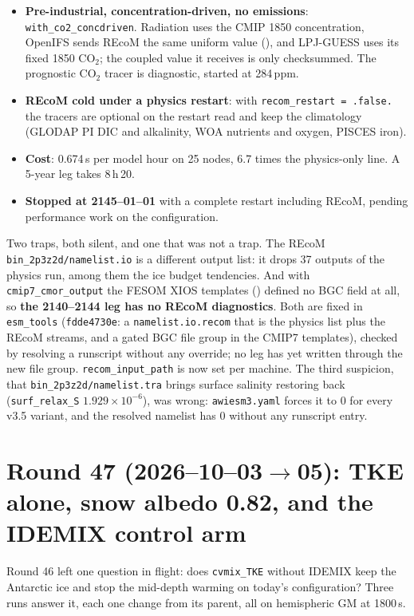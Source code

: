 \documentclass[10pt]{article}
\begin{document}
\begin{itemize}\itemsep1pt
\item \textbf{Pre-industrial, concentration-driven, no emissions}: \texttt{with\_co2\_concdriven}.
      Radiation uses the CMIP 1850 concentration, OpenIFS sends REcoM the same uniform value
      (), and LPJ-GUESS uses its fixed 1850 CO$_2$; the coupled value
      it receives is only checksummed. The prognostic CO$_2$ tracer is diagnostic, started at 284\,ppm.
\item \textbf{REcoM cold under a physics restart}: with \texttt{recom\_restart = .false.} the tracers
      are optional on the restart read and keep the climatology (GLODAP PI DIC and alkalinity, WOA
      nutrients and oxygen, PISCES iron).
\item \textbf{Cost}: 0.674\,s per model hour on 25 nodes, 6.7 times the physics-only line. A 5-year
      leg takes 8\,h\,20.
\item \textbf{Stopped at 2145--01--01} with a complete restart including REcoM, pending performance
      work on the configuration.
\end{itemize}

\noindent Two traps, both silent, and one that was not a trap. The REcoM
\texttt{bin\_2p3z2d/namelist.io} is a different output list: it drops 37 outputs of the physics run,
among them the ice budget tendencies. And with \texttt{cmip7\_cmor\_output} the FESOM XIOS templates
() defined no BGC field at all, so \textbf{the 2140--2144 leg has no REcoM
diagnostics}. Both are fixed in \texttt{esm\_tools} (\texttt{fdde4730e}: a \texttt{namelist.io.recom}
that is the physics list plus the REcoM streams, and a gated BGC file group in the CMIP7 templates),
checked by resolving a runscript without any override; no leg has yet written through the new file
group. \texttt{recom\_input\_path} is now set per machine. The third suspicion, that
\texttt{bin\_2p3z2d/namelist.tra} brings surface salinity restoring back
(\texttt{surf\_relax\_S} $1.929\times10^{-6}$), was wrong: \texttt{awiesm3.yaml} forces it to 0 for
every v3.5 variant, and the resolved namelist has 0 without any runscript entry.

\section{Round 47 (2026--10--03$\to$05): TKE alone, snow albedo 0.82, and the IDEMIX control arm}\label{sec:round47}

Round 46 left one question in flight: does \texttt{cvmix\_TKE} without IDEMIX keep the Antarctic ice
and stop the mid-depth warming on today's configuration? Three runs answer it, each one change from
its parent, all on hemispheric GM at 1800\,s.
\end{document}
